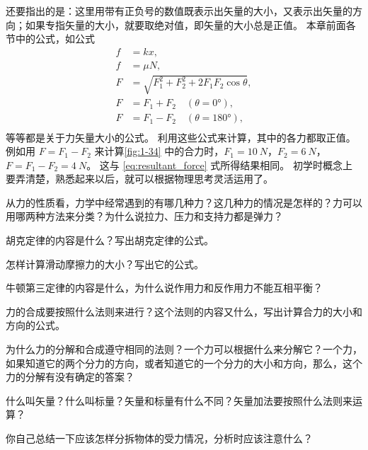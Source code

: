 还要指出的是：这里用带有正负号的数值既表示出矢量的大小，又表示出矢量的方向；如果专指矢量的大小，就要取绝对值，即矢量的大小总是正值。
本章前面各节中的公式，如公式
\[\begin{split}
f&=kx,\\
f&=\mu N,\\
F&=\sqrt{F^2_1+F^2_2+2F_1F_2\cos\theta},\\
F&=F_1+F_2\quad (\theta =\ang{0}),\\
F&=F_1-F_2\quad (\theta =\ang{180}),\\
\end{split} \]
等等都是关于力矢量大小的公式。
利用这些公式来计算，其中的各力都取正值。
例如用 $F=F_1-F_2$ 来计算\cref{fig:1-34} 中的合力时，$F_1=\qty{10}{N}$，$F_2=\qty{6}{N}$，$F=F_1-F_2=\qty{4}{N}$。
这与 \eqref{eq:resultant_force} 式所得结果相同。
初学时概念上要弄清楚，熟悉起来以后，就可以根据物理思考灵活运用了。

\begin{Review}
\begin{question}
  \item 从力的性质看，力学中经常遇到的有哪几种力？这几种力的情况是怎样的？力可以用哪两种方法来分类？为什么说拉力、压力和支持力都是弹力？
  \item 胡克定律的内容是什么？写出胡克定律的公式。
  \item 怎样计算滑动摩擦力的大小？写出它的公式。
  \item 牛顿第三定律的内容是什么，为什么说作用力和反作用力不能互相平衡？
  \item 力的合成要按照什么法则来进行？这个法则的内容又什么，写出计算合力的大小和方向的公式。
  \item 为什么力的分解和合成遵守相同的法则？一个力可以根据什么来分解它？一个力，如果知道它的两个分力的方向，或者知道它的一个分力的大小和方向，那么，这个力的分解有没有确定的答案？
  \item 什么叫矢量？什么叫标量？矢量和标量有什么不同？矢量加法要按照什么法则来运算？
  \item 你自己总结一下应该怎样分拆物体的受力情况，分析时应该注意什么？
\end{question}
\end{Review}

